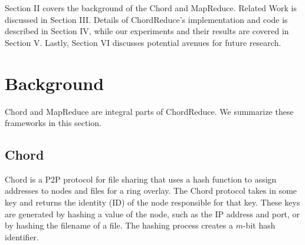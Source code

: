 \documentclass[10pt, conference, compsocconf]{IEEEtran}
\begin{document}
Section II covers the background  of the Chord and MapReduce.  Related Work is discussed in Section III. Details of ChordReduce's implementation and code is described in Section IV, while our experiments and their results are covered in Section V.  Lastly, Section VI discusses potential avenues for future research.





\section{Background}
Chord and MapReduce are integral parts of ChordReduce.  We summarize these frameworks in this section.
\subsection{Chord}
Chord \cite{Chord} is a P2P protocol for file sharing that uses a hash function to assign addresses to nodes and files for a ring overlay. The Chord protocol takes in some key and returns the identity (ID) of the node responsible for that key.  These keys are generated by hashing a value of the node, such as the IP address and port, or by hashing the filename of a file.  The hashing process creates a $m$-bit hash identifier.
\end{document}
